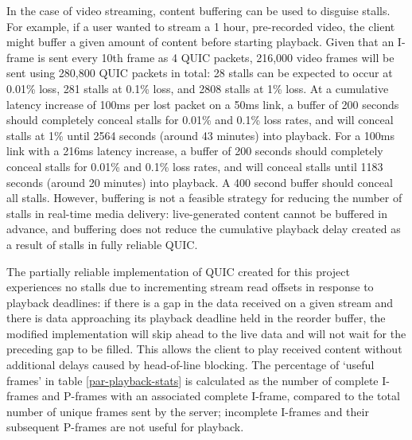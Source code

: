 \documentclass{mpaper}
\begin{document}
In the case of video streaming, content buffering can be used to disguise stalls. For example, if a user wanted to stream a 1 hour, pre-recorded video, the client might buffer a given amount of content before starting playback. Given that an I-frame is sent every 10th frame as 4 QUIC packets, 216,000 video frames will be sent using 280,800 QUIC packets in total: 28 stalls can be expected to occur at 0.01\% loss, 281 stalls at 0.1\% loss, and 2808 stalls at 1\% loss. At a cumulative latency increase of 100ms per lost packet on a 50ms link, a buffer of 200 seconds should completely conceal stalls for 0.01\% and 0.1\% loss rates, and will conceal stalls at 1\% until 2564 seconds (around 43 minutes) into playback. For a 100ms link with a 216ms latency increase, a buffer of 200 seconds should completely conceal stalls for 0.01\% and 0.1\% loss rates, and will conceal stalls until 1183 seconds (around 20 minutes) into playback. A 400 second buffer should conceal all stalls. However, buffering is not a feasible strategy for reducing the number of stalls in real-time media delivery: live-generated content cannot be buffered in advance, and buffering does not reduce the cumulative playback delay created as a result of stalls in fully reliable QUIC.



The partially reliable implementation of QUIC created for this project experiences no stalls due to incrementing stream read offsets in response to playback deadlines: if there is a gap in the data received on a given stream and there is data approaching its playback deadline held in the reorder buffer, the modified implementation will skip ahead to the live data and will not wait for the preceding gap to be filled. This allows the client to play received content without additional delays caused by head-of-line blocking. The percentage of `useful frames' in table \ref{par-playback-stats} is calculated as the number of complete I-frames and P-frames with an associated complete I-frame, compared to the total number of unique frames sent by the server; incomplete I-frames and their subsequent P-frames are not useful for playback.
\end{document}
